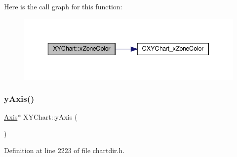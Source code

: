 Here is the call graph for this function\+:
\nopagebreak
\begin{figure}[H]
\begin{center}
\leavevmode
\includegraphics[width=343pt]{class_x_y_chart_adb04681a52549d78517588c01556871f_cgraph}
\end{center}
\end{figure}
\mbox{\label{class_x_y_chart_a22adca1189b6caa260d71fe4122033ab}} 
\subsubsection{\texorpdfstring{y\+Axis()}{yAxis()}}
{\footnotesize\ttfamily \hyperlink{class_axis}{Axis}$\ast$ X\+Y\+Chart\+::y\+Axis (\begin{DoxyParamCaption}{ }\end{DoxyParamCaption})\hspace{0.3cm}{\ttfamily [inline]}}



Definition at line 2223 of file chartdir.\+h.

